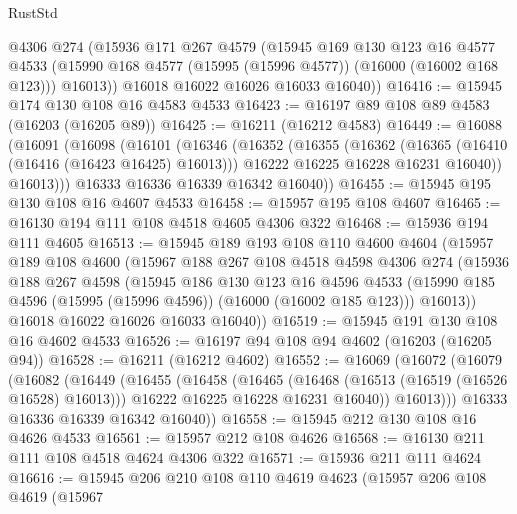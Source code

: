 \begin{lexlean}{RustStd}
\begin{coremodule}
        @4306
        @274
        (@15936
          @171
          @267
          @4579
          (@15945
            @169
            @130
            @123
            @16
            @4577
            @4533
            (@15990 @168 @4577 (@15995 (@15996 @4577)) (@16000 (@16002 @168 @123)))
            @16013))
        @16018
        @16022
        @16026
        @16033
        @16040))
@16416 := @15945 @174 @130 @108 @16 @4583 @4533
@16423 := @16197 @89 @108 @89 @4583 (@16203 (@16205 @89))
@16425 := @16211 (@16212 @4583)
@16449 := @16088
    (@16091
      (@16098
        (@16101
          (@16346
            (@16352
              (@16355
                (@16362
                  (@16365 (@16410 (@16416 (@16423 @16425) @16013)))
                  @16222
                  @16225
                  @16228
                  @16231
                  @16040))
              @16013)))
        @16333
        @16336
        @16339
        @16342
        @16040))
@16455 := @15945 @195 @130 @108 @16 @4607 @4533
@16458 := @15957 @195 @108 @4607
@16465 := @16130 @194 @111 @108 @4518 @4605 @4306 @322
@16468 := @15936 @194 @111 @4605
@16513 := @15945
    @189
    @193
    @108
    @110
    @4600
    @4604
    (@15957
      @189
      @108
      @4600
      (@15967
        @188
        @267
        @108
        @4518
        @4598
        @4306
        @274
        (@15936
          @188
          @267
          @4598
          (@15945
            @186
            @130
            @123
            @16
            @4596
            @4533
            (@15990 @185 @4596 (@15995 (@15996 @4596)) (@16000 (@16002 @185 @123)))
            @16013))
        @16018
        @16022
        @16026
        @16033
        @16040))
@16519 := @15945 @191 @130 @108 @16 @4602 @4533
@16526 := @16197 @94 @108 @94 @4602 (@16203 (@16205 @94))
@16528 := @16211 (@16212 @4602)
@16552 := @16069
    (@16072
      (@16079
        (@16082
          (@16449
            (@16455
              (@16458
                (@16465
                  (@16468 (@16513 (@16519 (@16526 @16528) @16013)))
                  @16222
                  @16225
                  @16228
                  @16231
                  @16040))
              @16013)))
        @16333
        @16336
        @16339
        @16342
        @16040))
@16558 := @15945 @212 @130 @108 @16 @4626 @4533
@16561 := @15957 @212 @108 @4626
@16568 := @16130 @211 @111 @108 @4518 @4624 @4306 @322
@16571 := @15936 @211 @111 @4624
@16616 := @15945
    @206
    @210
    @108
    @110
    @4619
    @4623
    (@15957
      @206
      @108
      @4619
      (@15967

\end{coremodule}
\end{lexlean}
